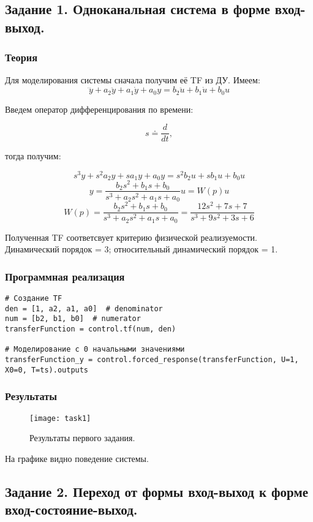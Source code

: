 \documentclass[16pt]{article}
\begin{document}
\subsection{Задание 1. Одноканальная система в форме вход-выход.}

\subsubsection{Теория}
Для моделирования системы сначала получим её TF из ДУ.
Имеем:
\[ \dddot{y} + a_2\ddot{y} + a_1\dot{y} + a_0y = b_2\ddot{u} + b_1\dot{u} + b_0u \]

Введем оператор дифференцирования по времени:

\[ s \doteq \frac{d}{dt} ,\]

тогда получим:

\[ s^3 y + s^2 a_2 y + s a_1 y + a_0 y = s^2 b_2 u + s b_1 u + b_0 u \]
\[ y = \frac{b_2 s^2 + b_1 s + b_0}{s^3 + a_2 s^2 + a_1 s + a_0}u = W(p)u \]
\[ W(p) = \frac{b_2 s^2 + b_1 s + b_0}{s^3 + a_2 s^2 + a_1 s + a_0} =  \frac{12 s^2 + 7 s + 7}{s^3 + 9 s^2 + 3 s + 6}\]

Полученная TF соответсвует критерию физической реализуемости. Динамический порядок = 3; относительный динамический порядок = 1.

\subsubsection{Программная реализация}
\begin{verbatim}
# Создание TF
den = [1, a2, a1, a0]  # denominator
num = [b2, b1, b0]  # numerator
transferFunction = control.tf(num, den)

# Моделирование с 0 начальными значениями
transferFunction_y = control.forced_response(transferFunction, U=1, X0=0, T=ts).outputs
\end{verbatim}

\subsubsection{Результаты}
\begin{figure}[H]
	\centering
	\texttt{[image: task1]}
	\caption{Результаты первого задания.}
	\label{fig:fig1}
\end{figure}
На графике видно поведение системы.

\newpage
\subsection{Задание 2. Переход от формы вход-выход к форме вход-состояние-выход.}
\end{document}
